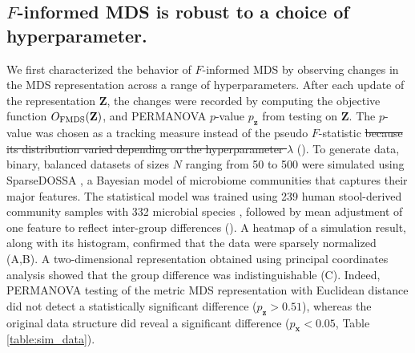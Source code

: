 \documentclass[10pt,letterpaper]{article}
\newcommand{\1}{{\rm 1}\kern-0.24em{\rm I}}
\providecommand{\DIFaddtex}[1]{{\protect\color{blue}\uwave{#1}}} %
\providecommand{\DIFdeltex}[1]{{\protect\color{red}\sout{#1}}}                      %
\providecommand{\DIFaddbegin}{} %
\providecommand{\DIFaddend}{} %
\providecommand{\DIFdelbegin}{} %
\providecommand{\DIFdelend}{} %
\providecommand{\DIFadd}[1]{\texorpdfstring{\DIFaddtex{#1}}{#1}} %
\providecommand{\DIFdel}[1]{\texorpdfstring{\DIFdeltex{#1}}{}} %
\newcommand{\DIFscaledelfig}{0.5}
\newlength{\DIFdelgraphicswidth} %
\newlength{\DIFdelgraphicsheight} %
\newcommand{\DIFaddincludegraphics}[2][]{{\color{blue}\fbox{\DIFOincludegraphics[#1]{#2}}}} %
\newcommand{\DIFdelincludegraphics}[2][]{%
\sbox{\DIFdelgraphicsbox}{\DIFOincludegraphics[#1]{#2}}%
\settoboxwidth{\DIFdelgraphicswidth}{\DIFdelgraphicsbox} %
\settoboxtotalheight{\DIFdelgraphicsheight}{\DIFdelgraphicsbox} %
\scalebox{\DIFscaledelfig}{%
\parbox[b]{\DIFdelgraphicswidth}{\usebox{\DIFdelgraphicsbox}\\[-\baselineskip] \rule{\DIFdelgraphicswidth}{0em}}\llap{\resizebox{\DIFdelgraphicswidth}{\DIFdelgraphicsheight}{%
\setlength{\unitlength}{\DIFdelgraphicswidth}%
\begin{picture}(1,1)%
\thicklines\linethickness{2pt} %
{\color[rgb]{1,0,0}\put(0,0){\framebox(1,1){}}}%
{\color[rgb]{1,0,0}\put(0,0){\line( 1,1){1}}}%
{\color[rgb]{1,0,0}\put(0,1){\line(1,-1){1}}}%
\end{picture}%
}\hspace*{3pt}}} %
} %
\DeclareRobustCommand{\DIFaddbegin}{\DIFOaddbegin \let\includegraphics\DIFaddincludegraphics} %
\DeclareRobustCommand{\DIFaddend}{\DIFOaddend \let\includegraphics\DIFOincludegraphics} %
\DeclareRobustCommand{\DIFdelbegin}{\DIFOdelbegin \let\includegraphics\DIFdelincludegraphics} %
\DeclareRobustCommand{\DIFdelend}{\DIFOaddend \let\includegraphics\DIFOincludegraphics} %
\begin{document}
\subsection*{$F$-informed MDS is robust to a choice of hyperparameter.}
We first characterized the behavior of $F$-informed MDS by observing changes in the MDS representation across a range of hyperparameters. After each update of the representation $\mathbf{Z}$, the changes were recorded by computing the objective function $O_{\rm FMDS}(\mathbf{Z})$, and PERMANOVA $p$-value $p_\mathbf{z}$ from testing on $\mathbf{Z}$. The $p$-value was chosen as a tracking measure instead of the pseudo $F$-statistic \DIFdelbegin \DIFdel{because its distribution varied depending on the hyperparameter $\lambda$ }\DIFdelend (). To generate data, binary, balanced datasets of sizes $N$ ranging from 50 to 500 were simulated using SparseDOSSA \cite{Ma21}, a Bayesian model of microbiome communities that captures their major features. The statistical model was trained using 239 human stool-derived community samples with 332 microbial species \cite{Lloyd17}, followed by mean adjustment of one feature to reflect inter-group differences (\DIFaddbegin \DIFadd{see ``Semisynthetic data'' in }\DIFaddend {}). A heatmap of a simulation result, along with its histogram, confirmed that the data were sparsely normalized (A,B). A two-dimensional representation obtained using principal coordinates analysis showed that the group difference was indistinguishable (C). Indeed, PERMANOVA testing of the metric MDS representation with Euclidean distance did not detect a statistically significant difference ($p_\mathbf{z}>0.51$), whereas the original data structure did reveal a significant difference ($p_\mathbf{x}<0.05$, Table \ref{table:sim_data}).
\end{document}
